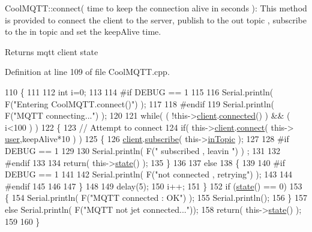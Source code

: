Cool\+M\+Q\+T\+T\+::connect( time to keep the connection alive in seconds )\+: This method is provided to connect the client to the server, publish to the out topic , subscribe to the in topic and set the keep\+Alive time.

\begin{DoxyReturn}{Returns}
mqtt client state 
\end{DoxyReturn}


Definition at line 109 of file Cool\+M\+Q\+T\+T.\+cpp.


\begin{DoxyCode}
110 \{       
111 
112     \textcolor{keywordtype}{int} i=0;
113 
114 \textcolor{preprocessor}{#if DEBUG == 1 }
115 
116     Serial.println( F(\textcolor{stringliteral}{"Entering CoolMQTT.connect()"}) );
117 
118 \textcolor{preprocessor}{#endif}
119     Serial.println( F(\textcolor{stringliteral}{"MQTT connecting..."}) );
120     
121     \textcolor{keywordflow}{while}( ( !this->\hyperlink{class_cool_m_q_t_t_afed1372683c44893b4668d0f1771f514}{client}.\hyperlink{class_cool_pub_sub_client_a3d5a5da4ddb1e5c1bea64d80c665d148}{connected}() ) && ( i<100 ) ) 
122     \{
123         \textcolor{comment}{// Attempt to connect}
124         \textcolor{keywordflow}{if}( this->\hyperlink{class_cool_m_q_t_t_afed1372683c44893b4668d0f1771f514}{client}.\hyperlink{class_cool_pub_sub_client_a2664c2ebc302b2fa49f493a339ecc891}{connect}( this-> \hyperlink{class_cool_m_q_t_t_a8cd47e45d457f908d4b4390b35aaee83}{user},keepAlive*10  ) )
125         \{
126             \hyperlink{class_cool_m_q_t_t_afed1372683c44893b4668d0f1771f514}{client}.\hyperlink{class_cool_pub_sub_client_ac1ebc9ad874128aefa985d78496d2e8f}{subscribe}( this->\hyperlink{class_cool_m_q_t_t_a4492f52a441e83cc5151010317fdb52d}{inTopic} );
127 
128 \textcolor{preprocessor}{        #if DEBUG == 1 }
129 
130             Serial.println( F(\textcolor{stringliteral}{" subscribed , leavin "}) ) ;
131         
132 \textcolor{preprocessor}{        #endif}
133 
134             \textcolor{keywordflow}{return}( this->\hyperlink{class_cool_m_q_t_t_a5d003307eff78efbd585e42b43b72b6d}{state}() );
135         \}
136 
137         \textcolor{keywordflow}{else}
138         \{
139         
140 \textcolor{preprocessor}{        #if DEBUG == 1 }
141 
142             Serial.println( F(\textcolor{stringliteral}{"not connected , retrying"}) );
143         
144 \textcolor{preprocessor}{        #endif}
145 
146             
147         \}
148 
149     delay(5);
150     i++;
151     \}
152     \textcolor{keywordflow}{if} (\hyperlink{class_cool_m_q_t_t_a5d003307eff78efbd585e42b43b72b6d}{state}() == 0)
153     \{
154         Serial.println( F(\textcolor{stringliteral}{"MQTT connected : OK"}) );
155         Serial.println();
156     \}
157     \textcolor{keywordflow}{else} Serial.println( F(\textcolor{stringliteral}{"MQTT not jet connected..."}));
158     \textcolor{keywordflow}{return}( this->\hyperlink{class_cool_m_q_t_t_a5d003307eff78efbd585e42b43b72b6d}{state}() );
159 
160 \}
\end{DoxyCode}
